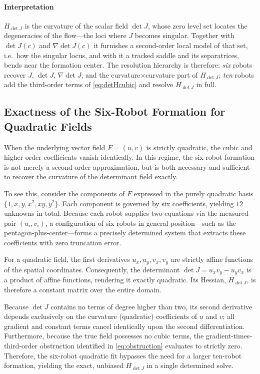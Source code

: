 \documentclass[journal]{IEEEtran}
\begin{document}
\paragraph{Interpretation}
$H_{\det J}$ is the curvature of the scalar field $\det J$, whose zero level set
locates the degeneracies of the flow---the loci where $J$ becomes singular.
Together with $\det J(c)$ and $\nabla\!\det J(c)$ it furnishes a second-order local
model of that set, i.e.\ how the singular locus, and with it a tracked saddle and
its separatrices, bends near the formation center. The resolution hierarchy is
therefore: \emph{six} robots recover $J$, $\det J$, $\nabla\!\det J$, and the
curvature$\times$curvature part of $H_{\det J}$; \emph{ten} robots add the
third-order terms of \eqref{eq:detHcubic} and resolve $H_{\det J}$ in full.

\subsection{Exactness of the Six-Robot Formation for Quadratic Fields}
\label{sec:exact_quadratic}

When the underlying vector field $F=(u,v)$ is strictly quadratic, the cubic and higher-order coefficients vanish identically. In this regime, the six-robot formation is not merely a second-order approximation, but is both necessary and sufficient to recover the curvature of the determinant field exactly.

To see this, consider the components of $F$ expressed in the purely quadratic basis $\{1, x, y, x^2, xy, y^2\}$. Each component is governed by six coefficients, yielding $12$ unknowns in total. Because each robot supplies two equations via the measured pair $(u_i, v_i)$, a configuration of six robots in general position---such as the pentagon-plus-center---forms a precisely determined system that extracts these coefficients with zero truncation error.

For a quadratic field, the first derivatives $u_x, u_y, v_x, v_y$ are strictly affine functions of the spatial coordinates. Consequently, the determinant $\det J = u_x v_y - u_y v_x$ is a product of affine functions, rendering it exactly quadratic. Its Hessian, $H_{\det J}$, is therefore a constant matrix over the entire domain.

Because $\det J$ contains no terms of degree higher than two, its second derivative depends exclusively on the curvature (quadratic) coefficients of $u$ and $v$; all gradient and constant terms cancel identically upon the second differentiation. Furthermore, because the true field possesses no cubic terms, the gradient-times-third-order obstruction identified in \eqref{eq:obstruction} evaluates to strictly zero. Therefore, the six-robot quadratic fit bypasses the need for a larger ten-robot formation, yielding the exact, unbiased $H_{\det J}$ in a single determined solve.
\end{document}

